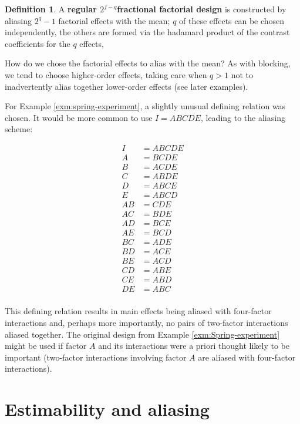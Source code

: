 \documentclass[
]{book}
\theoremstyle{definition}
\newtheorem{definition}{Definition}[chapter]
\theoremstyle{definition}
\theoremstyle{definition}
\theoremstyle{definition}
\theoremstyle{remark}
\begin{document}
\begin{definition}
\protect\hypertarget{def:regular-fraction}{}\label{def:regular-fraction}A \textbf{regular \(2^{f-q}\)fractional factorial design} is constructed by aliasing \(2^q-1\) factorial effects with the mean; \(q\) of these effects can be chosen independently, the others are formed via the hadamard product of the contrast coefficients for the \(q\) effects,
\end{definition}

How do we chose the factorial effects to alias with the mean? As with blocking, we tend to choose higher-order effects, taking care when \(q>1\) not to inadvertently alias together lower-order effects (see later examples).

For Example \ref{exm:spring-experiment}, a slightly unusual defining relation was chosen. It would be more common to use \(I = ABCDE\), leading to the aliasing scheme:

\begin{align}
I & = ABCDE \\
A & = BCDE \\
B & = ACDE \\
C & = ABDE \\
D & = ABCE \\
E & = ABCD \\
AB & = CDE \\
AC & = BDE \\
AD & = BCE \\
AE & = BCD \\
BC & = ADE \\
BD & = ACE \\
BE & = ACD \\
CD & = ABE \\
CE & = ABD \\
DE & = ABC \\
\end{align}

This defining relation results in main effects being aliased with four-factor interactions and, perhaps more importantly, no pairs of two-factor interactions aliased together. The original design from Example \ref{exm:Spring-experiment} might be used if factor \(A\) and its interactions were a priori thought likely to be important (two-factor interactions involving factor \(A\) are aliased with four-factor interactions).

\hypertarget{est-alias}{%
\section{Estimability and aliasing}\label{est-alias}}
\end{document}
